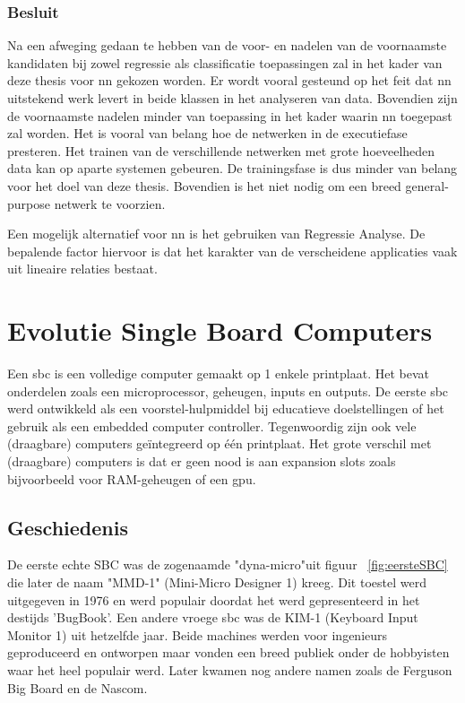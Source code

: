 	\subsubsection{Besluit}
	Na een afweging gedaan te hebben van de voor- en nadelen van de voornaamste kandidaten bij zowel regressie als classificatie toepassingen zal in het kader van deze thesis voor \gls{nn} gekozen worden. Er wordt vooral gesteund op het feit dat \gls{nn} uitstekend werk levert in beide klassen in het analyseren van data. Bovendien zijn de voornaamste nadelen minder van toepassing in het kader waarin \gls{nn} toegepast zal worden. Het is vooral van belang hoe de netwerken in de executiefase presteren. Het trainen van de verschillende netwerken met grote hoeveelheden data kan op aparte systemen gebeuren. De trainingsfase is dus minder van belang voor het doel van deze thesis. Bovendien is het niet nodig om een breed general-purpose netwerk te voorzien.
	
	Een mogelijk alternatief voor \gls{nn} is het gebruiken van Regressie Analyse. De bepalende factor hiervoor is dat het karakter van de verscheidene applicaties vaak uit lineaire relaties bestaat. 
		
		
		
		
 
	

\newpage	

\section{Evolutie Single Board Computers}
Een \gls{sbc} is een volledige computer gemaakt op 1 enkele printplaat. Het bevat onderdelen zoals een microprocessor, geheugen, inputs en outputs. De eerste \gls{sbc} werd ontwikkeld als een voorstel-hulpmiddel bij educatieve doelstellingen of het gebruik als een embedded computer controller. Tegenwoordig zijn ook vele (draagbare) computers ge\"integreerd op \'e\'en printplaat. Het grote verschil met (draagbare) computers is dat er geen nood is aan expansion slots zoals bijvoorbeeld voor RAM-geheugen of een \gls{gpu}.
	\subsection{Geschiedenis}
	De eerste echte SBC was de zogenaamde "dyna-micro"\space uit figuur ~\ref{fig:eersteSBC} die later de naam "MMD-1" (Mini-Micro Designer 1) kreeg\cite{bron:fotoeerstesbc}. Dit toestel werd uitgegeven in 1976 en werd populair doordat het werd gepresenteerd in het destijds 'BugBook'. Een andere vroege \gls{sbc} was de KIM-1 (Keyboard Input Monitor 1) uit hetzelfde jaar. Beide machines werden voor ingenieurs geproduceerd en ontworpen maar vonden een breed publiek onder de hobbyisten waar het heel populair werd. Later kwamen nog andere namen zoals de Ferguson Big Board en de Nascom.

